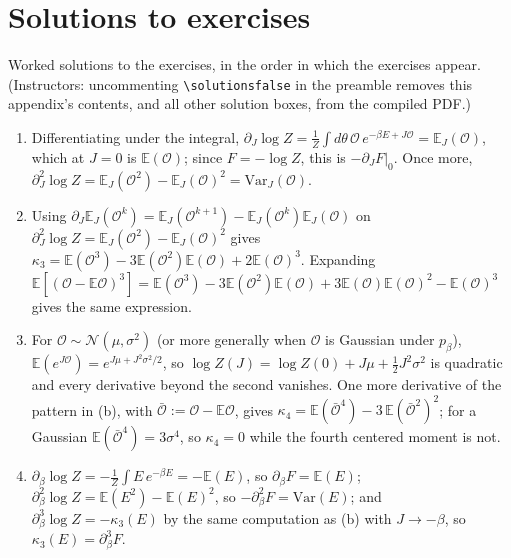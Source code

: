 \documentclass[11pt]{article}
\newcommand{\E}{\mathbb{E}}
\newcommand{\CN}{{\mathcal N}}
\newcommand{\CO}{{\mathcal O}}
\newcommand{\pd}{\partial}
\begin{document}
\section{Solutions to exercises}
\label{app:solutions}

Worked solutions to the exercises, in the order in which the exercises appear. (Instructors: uncommenting \verb|\solutionsfalse| in the preamble removes this appendix's contents, and all other solution boxes, from the compiled PDF.)

\begin{solution}[ex:cumulants]
\begin{enumerate}
    \item Differentiating under the integral, $\pd_J\log Z = \frac{1}{Z}\int d\theta\,\CO\,e^{-\beta E+J\CO} = \E_J(\CO)$, which at $J=0$ is $\E(\CO)$; since $F=-\log Z$, this is $-\pd_JF|_0$. Once more, $\pd_J^2\log Z = \E_J(\CO^2)-\E_J(\CO)^2 = \mathrm{Var}_J(\CO)$.
    \item Using $\pd_J\E_J(\CO^k) = \E_J(\CO^{k+1}) - \E_J(\CO^k)\E_J(\CO)$ on $\pd_J^2\log Z = \E_J(\CO^2)-\E_J(\CO)^2$ gives
    $\kappa_3 = \E(\CO^3) - 3\E(\CO^2)\E(\CO) + 2\E(\CO)^3$. Expanding $\E[(\CO-\E\CO)^3] = \E(\CO^3) - 3\E(\CO^2)\E(\CO) + 3\E(\CO)\E(\CO)^2 - \E(\CO)^3$ gives the same expression.
    \item For $\CO\sim\CN(\mu,\sigma^2)$ (or more generally when $\CO$ is Gaussian under $p_\beta$), $\E(e^{J\CO}) = e^{J\mu+J^2\sigma^2/2}$, so $\log Z(J) = \log Z(0) + J\mu + \frac{1}{2}J^2\sigma^2$ is quadratic and every derivative beyond the second vanishes. One more derivative of the pattern in (b), with $\bar\CO := \CO - \E\CO$, gives $\kappa_4 = \E(\bar\CO^4) - 3\,\E(\bar\CO^2)^2$; for a Gaussian $\E(\bar\CO^4) = 3\sigma^4$, so $\kappa_4 = 0$ while the fourth centered moment is not.
    \item $\pd_\beta\log Z = -\frac{1}{Z}\int E\,e^{-\beta E} = -\E(E)$, so $\pd_\beta F = \E(E)$; $\pd_\beta^2\log Z = \E(E^2)-\E(E)^2$, so $-\pd_\beta^2F = \mathrm{Var}(E)$; and $\pd_\beta^3\log Z = -\kappa_3(E)$ by the same computation as (b) with $J\to-\beta$, so $\kappa_3(E) = \pd_\beta^3F$.
\end{enumerate}
\end{solution}
\end{document}
